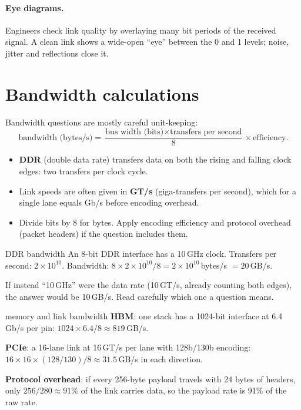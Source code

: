\paragraph{Eye diagrams.} Engineers check link quality by overlaying many bit periods of the received signal. A clean link shows a wide-open ``eye'' between the 0 and 1 levels; noise, jitter and reflections close it.

\section{Bandwidth calculations}
\label{sec:bandwidth}

Bandwidth questions are mostly careful unit-keeping:
\[
  \text{bandwidth (bytes/s)} = \frac{\text{bus width (bits)} \times \text{transfers per second}}{8} \times \text{efficiency}.
\]

\begin{itemize}
  \item \textbf{DDR} (double data rate) transfers data on both the rising and falling clock edges: two transfers per clock cycle.
  \item Link speeds are often given in \textbf{GT/s} (giga-transfers per second), which for a single lane equals Gb/s before encoding overhead.
  \item Divide bits by 8 for bytes. Apply encoding efficiency and protocol overhead (packet headers) if the question includes them.
\end{itemize}

\begin{worked}{DDR bandwidth}
An 8-bit DDR interface has a 10\,GHz clock. Transfers per second: $2 \times 10^{10}$. Bandwidth: $8 \times 2\times10^{10}/8 = 2\times10^{10}$\,bytes/s $= 20$\,GB/s.

If instead ``10\,GHz'' were the data rate (10\,GT/s, already counting both edges), the answer would be 10\,GB/s. Read carefully which one a question means.
\end{worked}

\begin{worked}{memory and link bandwidth}
\textbf{HBM}: one stack has a 1024-bit interface at 6.4\,Gb/s per pin: $1024 \times 6.4/8 \approx 819$\,GB/s.

\textbf{PCIe}: a 16-lane link at 16\,GT/s per lane with 128b/130b encoding: $16 \times 16 \times (128/130)/8 \approx 31.5$\,GB/s in each direction.

\textbf{Protocol overhead}: if every 256-byte payload travels with 24 bytes of headers, only $256/280 \approx 91\%$ of the link carries data, so the payload rate is 91\% of the raw rate.
\end{worked}

